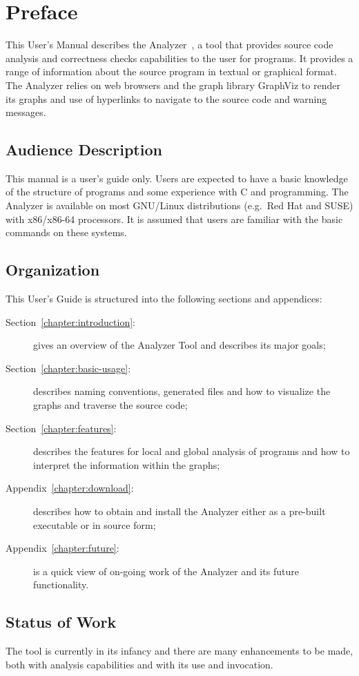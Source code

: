 \section*{Preface}

This User's Manual describes the \openshmem
Analyzer~\cite{hernandez2012openshmem}, a tool that provides source
code analysis and correctness checks capabilities to the user for
\openshmem programs. It provides a range of information about the
source program in textual or graphical format. The \openshmem Analyzer
relies on web browsers and the graph library GraphViz to render its
graphs and use of hyperlinks to navigate to the source code and
warning messages.

\subsection*{Audience Description}

This manual is a user's guide only. Users are expected to have a basic
knowledge of the structure of programs and some experience with C and
\openshmem programming. The \openshmem Analyzer is available on most
GNU/Linux distributions (e.g.\ Red Hat and SUSE) with x86/x86-64
processors. It is assumed that users are familiar with the basic
commands on these systems.

\subsection*{Organization}

This User's Guide is structured into the following sections and
appendices:

\begin{description}
\item[Section~\ref{chapter:introduction}:~]
  gives an overview of the \openshmem Analyzer Tool and describes its
  major goals;
\item[Section~\ref{chapter:basic-usage}:~]
  describes naming conventions, generated files and how to visualize
  the graphs and traverse the source code;
\item[Section~\ref{chapter:features}:~]
  describes the features for local and global analysis of \openshmem
  programs and how to interpret the information within the graphs;
\item [Appendix~\ref{chapter:download}:~]
  describes how to obtain and install the \openshmem Analyzer either
  as a pre-built executable or in source form;
\item [Appendix~\ref{chapter:future}:~] is a
  quick view of on-going work of the \openshmem Analyzer and its
  future functionality.
\end{description}

\subsection*{Status of Work}

The tool is currently in its infancy and there are many enhancements
to be made, both with analysis capabilities and with its use and
invocation.
